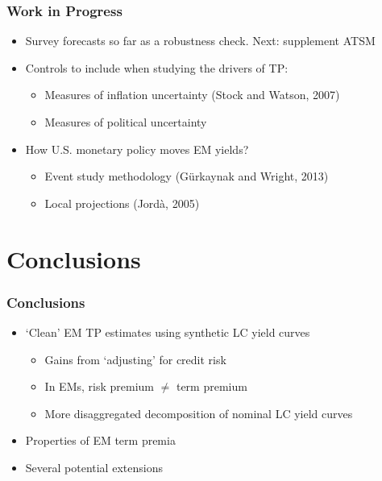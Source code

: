 \documentclass[12pt, aspectratio=169, xcolor=dvipsnames]{beamer} 			         %
\begin{document}
\begin{frame}
	\frametitle{Work in Progress}
	\begin{itemize}
		\item Survey forecasts so far as a robustness check. Next: supplement ATSM
		\item Controls to include when studying the drivers of TP:
		\begin{itemize}
			\item Measures of inflation uncertainty (Stock and Watson, 2007)
			\item Measures of political uncertainty \citep{BakerBloomDavis:2016}
		\end{itemize}
	\item How U.S. monetary policy moves EM yields?
	\begin{itemize}
		\item Event study methodology (G\"{u}rkaynak and Wright, 2013)
		\item Local projections (Jord\`a, 2005)
	\end{itemize}
	\end{itemize}
\end{frame}


\section{Conclusions}

\begin{frame}
	\frametitle{Conclusions}
	\begin{itemize}
		\item `Clean' EM TP estimates using synthetic LC yield curves
		\begin{itemize}
			\item Gains from `adjusting' for credit risk
			\item In EMs, risk premium $\neq$ term premium
			\item More disaggregated decomposition of nominal LC yield curves
		\end{itemize}
		\item Properties of EM term premia
		\item Several potential extensions
	\end{itemize}
\end{frame}
\end{document}
